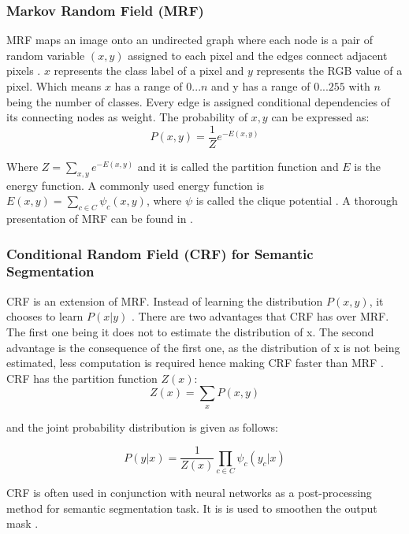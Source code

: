 \subsubsection{Markov Random Field (MRF)} MRF maps an image onto an undirected graph where each node is a pair of random variable $(x,y)$ assigned to each pixel and the edges connect adjacent pixels \cite{YU201882}. $x$ represents the class label of a pixel and $y$ represents the RGB value of a pixel. Which means $x$ has a range of ${0...n}$ and y has a range of ${0...255}$ with $n$ being the number of classes.  Every edge is assigned conditional dependencies of its connecting nodes as weight. The probability of $x,y$ can be expressed as:
\begin{equation}
    P(x,y) = \frac{1}{Z} e^{-E(x,y)}
\end{equation}

Where $Z = \sum_{x,y}e^{-E(x,y)}$ and it is called the partition function and $E$ is the energy function. A commonly used energy function is $E(x,y) = \sum_{c\in C}\psi_{c}(x,y)$, where $\psi$ is called the clique potential \cite{DBLP:journals/corr/Thoma16a}. A thorough presentation of MRF can be found in \cite{markovbook}. 

\subsubsection{Conditional Random Field (CRF) for Semantic Segmentation} CRF is an extension of MRF. Instead of learning the distribution $P(x,y)$, it chooses to learn $P(x|y)$ \cite{DBLP:journals/corr/Thoma16a}. There are two advantages that CRF has over MRF. The first one being it does not to estimate the distribution of x. The second advantage is the consequence of the first one, as the distribution of x is not being estimated, less computation is required hence making CRF faster than MRF \cite{YU201882}. CRF has the partition function $Z(x)$:
\begin{equation}
    Z(x) = \sum_{x} P(x,y)
\end{equation}

\noindent and the joint probability distribution is given as follows:

\begin{equation}
    P(y|x) = \frac{1}{Z(x)} \prod_{c \in C}\psi_{c}(y_{c}|x)
\end{equation}

\noindent CRF is often used in conjunction with neural networks as a post-processing method for semantic segmentation task. It is is used to smoothen the output mask \cite{crf-semantic}.

